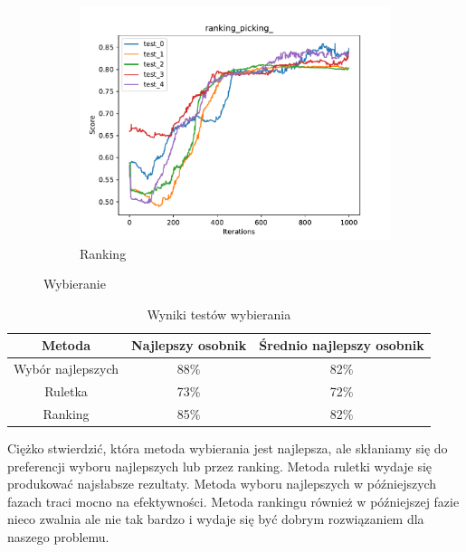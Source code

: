 \begin{figure}[H]
\begin{subfigure}[b]{0.49\linewidth}
        \includegraphics[width=\linewidth]{img/ranking_picking_.pdf}
        \caption{Ranking}
    \end{subfigure}
    \caption{Wybieranie}
    \label{fig:picking}
\end{figure}

\begin{table}[H]
    \centering
    \begin{tabular}{|c|c|c|}
    \hline
    Metoda       & Najlepszy osobnik & Średnio najlepszy osobnik \\ \hline
    Wybór najlepszych  & 88\%              & 82\%                      \\ \hline
    Ruletka      & 73\%              & 72\%                      \\ \hline
    Ranking      & 85\%              & 82\%                      \\ \hline
    \end{tabular}
    \caption{Wyniki testów wybierania}
    \label{tab:picking}
\end{table}
Ciężko stwierdzić, która metoda wybierania jest najlepsza, ale skłaniamy się do preferencji wyboru najlepszych lub przez ranking. Metoda ruletki wydaje się produkować najsłabsze rezultaty. Metoda wyboru najlepszych w późniejszych fazach traci mocno na efektywności. Metoda rankingu również w późniejszej fazie nieco zwalnia ale nie tak bardzo i wydaje się być dobrym rozwiązaniem dla naszego problemu.